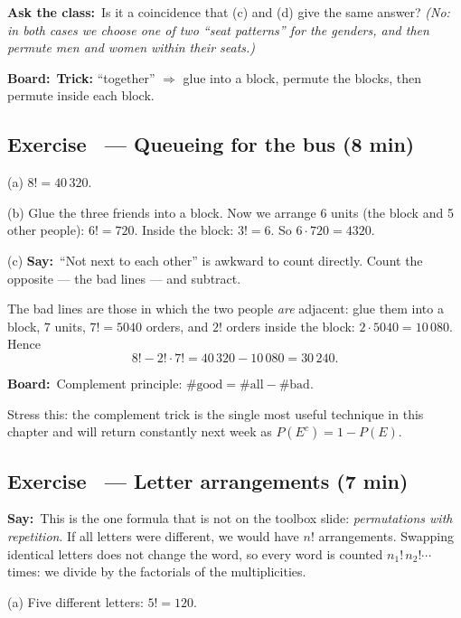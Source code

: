 \documentclass[11pt,a4paper,parskip=half]{scrartcl}
\newcommand{\say}{\textbf{\color{teal}Say:}\ }
\newcommand{\board}{\textbf{\color{gold}Board:}\ }
\newcommand{\ask}{\textbf{\color{navy}Ask the class:}\ }
\newcommand{\slide}[1]{\marginpar{\raggedright\footnotesize\color{gray}slide #1}}
\begin{document}
\ask Is it a coincidence that (c) and (d) give the same answer? \emph{(No: in
	both cases we choose one of two ``seat patterns'' for the genders, and then
	permute men and women within their seats.)}

\board \textbf{Trick:} ``together'' $\Rightarrow$ glue into a block, permute
the blocks, then permute inside each block.

\subsection{Exercise~ --- Queueing for the bus (8 min)}\slide{7}


(a) $8! = 40\,320$.

(b) Glue the three friends into a block. Now we arrange 6 units (the block and
5 other people): $6! = 720$. Inside the block: $3! = 6$. So
$6\cdot 720 = 4320$.

(c) \say ``Not next to each other'' is awkward to count directly. Count the
opposite --- the bad lines --- and subtract.

The bad lines are those in which the two people \emph{are} adjacent: glue
them into a block, $7$ units, $7! = 5040$ orders, and $2!$ orders inside the
block: $2\cdot 5040 = 10\,080$. Hence
\[ 8! - 2!\cdot 7! = 40\,320-10\,080 = 30\,240. \]

\board Complement principle: $\#\text{good} = \#\text{all} - \#\text{bad}$.

\begin{cue}
	Stress this: the complement trick is the single most useful technique in
	this chapter and will return constantly next week as $P(E^c)=1-P(E)$.
\end{cue}

\subsection{Exercise~ --- Letter arrangements (7 min)}\slide{8}


\say This is the one formula that is not on the toolbox slide:
\emph{permutations with repetition}. If all letters were different, we would
have $n!$ arrangements. Swapping identical letters does not change the word, so every word is
counted $n_1!\,n_2!\cdots$ times: we divide by the factorials of the
multiplicities.

(a) Five different letters: $5! = 120$.
\end{document}
